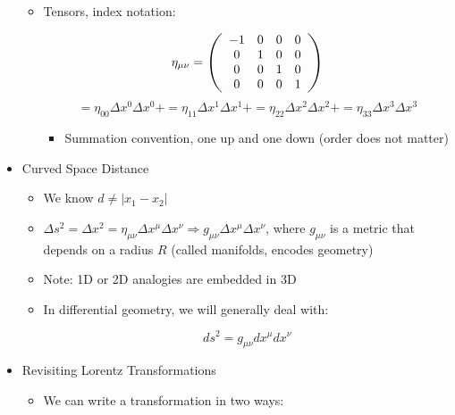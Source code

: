 \begin{itemize}
\begin{itemize}
      \item Tensors, index notation:

        $$\eta_{\mu\nu}=\left( \begin{array}{c c c c} -1 & 0 & 0 & 0\\ 0 & 1 & 0 & 0\\ 0 & 0 & 1 & 0\\ 0 & 0 & 0 & 1\\ \end{array}\right)$$
        $$=\eta_{00}\Delta x^0\Delta x^0+=\eta_{11}\Delta x^1\Delta x^1+=\eta_{22}\Delta x^2\Delta x^2+=\eta_{33}\Delta x^3\Delta x^3$$

        \begin{itemize}

          \item Summation convention, one up and one down (order does not matter)

        \end{itemize}

    \end{itemize}

  \item Curved Space Distance

    \begin{itemize}

      \item We know $d\neq|x_1-x_2|$

      \item $\Delta s^2=\Delta x^2=\eta_{\mu\nu}\Delta x^{\mu}\Delta x^{\nu}\Rightarrow g_{\mu\nu}\Delta x^{\mu}\Delta x^{\nu}$, where $g_{\mu\nu}$ is a metric that depends on a radius $R$ (called manifolds, encodes geometry)

      \item Note: 1D or 2D analogies are embedded in 3D

      \item In differential geometry, we will generally deal with:

        $$ds^2=g_{\mu\nu}dx^{\mu}dx^{\nu}$$

    \end{itemize}

  \item Revisiting Lorentz Transformations

    \begin{itemize}

      \item We can write a transformation in two ways:


\end{itemize}
\end{itemize}
